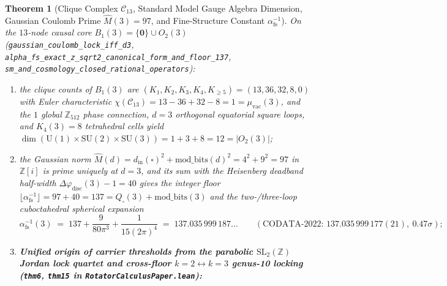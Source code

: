 \documentclass[11pt,a4paper]{article}
\theoremstyle{plain}
\newtheorem{theorem}{Theorem}[section]
\theoremstyle{definition}
\begin{document}
\begin{theorem}[Clique Complex $\mathcal{C}_{13}$, Standard Model Gauge Algebra Dimension, Gaussian Coulomb Prime $\hat{M}(3)=97$, and Fine-Structure Constant $\alpha_{\mathrm{fs}}^{-1}$]
\label{thm:sm-alpha}
On the $13$-node causal core $B_1(3) = \{\mathbf{0}\}\cup O_2(3)$ (\texttt{gaussian\_coulomb\_lock\_iff\_d3}, \texttt{alpha\_fs\_exact\_z\_sqrt2\_canonical\_form\_and\_floor\_137}, \texttt{sm\_and\_cosmology\_closed\_rational\_operators}):
\begin{enumerate}[label=\textbf{(\roman*)},leftmargin=*]
\item the clique counts of $B_1(3)$ are $(K_1,K_2,K_3,K_4,K_{\ge 5}) = (13, 36, 32, 8, 0)$ with Euler characteristic $\chi(\mathcal{C}_{13}) = 13 - 36 + 32 - 8 = 1 = \mu_{\mathrm{vac}}(3)$, and the $1$ global $\mathbb{Z}_{512}$ phase connection, $d=3$ orthogonal equatorial square loops, and $K_4(3)=8$ tetrahedral cells yield $\dim(\mathrm{U}(1)\times\mathrm{SU}(2)\times\mathrm{SU}(3)) = 1 + 3 + 8 = 12 = |O_2(3)|$;
\item the Gaussian norm $\hat{M}(d) = d_{\mathrm{in}}(\square)^2 + \mathrm{mod\_bits}(d)^2 = 4^2 + 9^2 = 97$ in $\mathbb{Z}[i]$ is prime uniquely at $d=3$, and its sum with the Heisenberg deadband half-width $\Delta\varphi_{\mathrm{disc}}(3)-1 = 40$ gives the integer floor $\lfloor\alpha_{\mathrm{fs}}^{-1}\rfloor = 97 + 40 = 137 = Q_\square(3) + \mathrm{mod\_bits}(3)$ and the two-/three-loop cuboctahedral spherical expansion
  \begin{equation}
    \label{eq:alpha-fs-137}
    \alpha_{\mathrm{fs}}^{-1}(3) \;=\; 137 + \frac{9}{80\pi^3} + \frac{1}{15(2\pi)^4} \;=\; 137.035\,999\,187\dots
    \qquad (\text{CODATA-2022: } 137.035\,999\,177(21),\ 0.47\sigma);
  \end{equation}
\item \textbf{Unified origin of carrier thresholds from the parabolic $\mathrm{SL}_2(\mathbb{Z})$ Jordan lock quartet and cross-floor $k=2 \leftrightarrow k=3$ genus-10 locking (\texttt{thm6}, \texttt{thm15} in \texttt{RotatorCalculusPaper.lean}):}

\end{enumerate}
\end{theorem}
\end{document}
